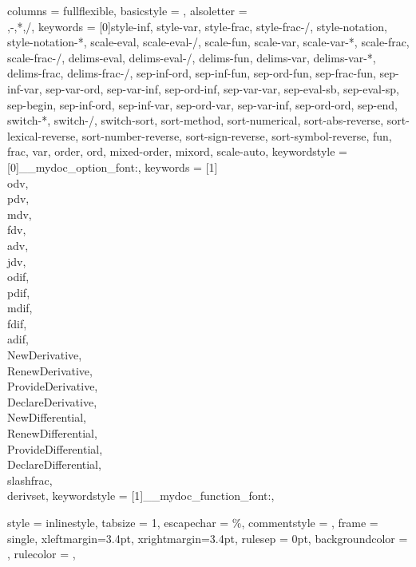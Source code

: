 	{
		columns = fullflexible,
		basicstyle = \ttfamily\upshape\small,
		alsoletter =  {\\,-,*,/},
		keywords = [0]{style-inf, style-var, style-frac, style-frac-/, style-notation, style-notation-*, scale-eval, scale-eval-/, scale-fun, scale-var, scale-var-*, scale-frac, scale-frac-/, delims-eval, delims-eval-/, delims-fun, delims-var, delims-var-*, delims-frac, delims-frac-/, sep-inf-ord, sep-inf-fun, sep-ord-fun, sep-frac-fun, sep-inf-var, sep-var-ord, sep-var-inf, sep-ord-inf, sep-var-var, sep-eval-sb, sep-eval-sp, sep-begin, sep-inf-ord, sep-inf-var, sep-ord-var, sep-var-inf, sep-ord-ord, sep-end, switch-*, switch-/, switch-sort, sort-method, sort-numerical, sort-abs-reverse, sort-lexical-reverse, sort-number-reverse, sort-sign-reverse, sort-symbol-reverse, fun, frac, var, order, ord, mixed-order, mixord, scale-auto},
		keywordstyle = [0]\__mydoc_option_font:,
		keywords = [1]{\\odv, \\pdv, \\mdv, \\fdv, \\adv, \\jdv, \\odif, \\pdif, \\mdif, \\fdif, \\adif, \\NewDerivative, \\RenewDerivative, \\ProvideDerivative, \\DeclareDerivative, \\NewDifferential, \\RenewDifferential, \\ProvideDifferential, \\DeclareDifferential, \\slashfrac, \\derivset},
		keywordstyle = [1]\__mydoc_function_font:,
	}
	
	{
		style = inlinestyle,
		tabsize = 1,
		escapechar = \%,
		commentstyle = \footnotesize,
		frame = single,
		xleftmargin=3.4pt,
		xrightmargin=3.4pt,
		rulesep = 0pt,
		backgroundcolor = \color{RoyalLightGray},
		rulecolor = \color{RoyalGray},
	}
	
	

